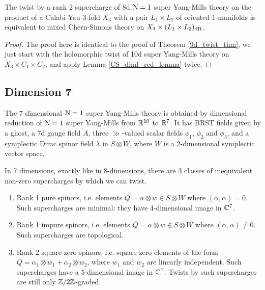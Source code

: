 \documentclass[10pt, oneside]{article}
\begin{document}
\begin{theorem} \label{8d_rank2_twist_thm}
The twist by a rank 2 supercharge of 8d $\mathcal{N}=1$ super Yang-Mills theory on the product of a Calabi-Yau 3-fold $X_3$ with a pair $L_1 \times L_2$ of oriented 1-manifolds is equivalent to mixed Chern-Simons theory on $X_3 \times (L_1 \times L_2)_{\mathrm{dR}}$.
\end{theorem}

\begin{proof}
The proof here is identical to the proof of Theorem \ref{9d_twist_thm}, we just start with the holomorphic twist of 10d super Yang-Mills theory on $X_3 \times C_1 \times C_2$, and apply Lemma \ref{CS_diml_red_lemma} twice.
\end{proof}



\subsection{Dimension 7}
The 7-dimensional $\mathcal{N}=1$ super Yang-Mills theory is obtained by dimensional reduction of $\mathcal{N}=1$ super Yang-Mills from $\mathbb R^{10}$ to $\mathbb R^7$.  It has BRST fields given by a ghost, a 7d gauge field $A$, three $\gg$-valued scalar fields $\phi_1$, $\phi_2$ and $\phi_3$, and a symplectic Dirac spinor field $\lambda$ in $S \otimes W$, where $W$ is a 2-dimensional symplectic vector space.

In 7 dimensions, exactly like in 8-dimensions, there are 3 classes of inequivalent non-zero supercharges by which we can twist.
\begin{enumerate}
 \item Rank 1 pure spinors, i.e. elements $Q = \alpha \otimes w \in S \otimes W$ where $(\alpha, \alpha)=0$.  Such supercharges are minimal: they have 4-dimensional image in $\mathbb C^7$.
 \item Rank 1 impure spinors, i.e. elements $Q = \alpha \otimes w \in S \otimes W$ where $(\alpha, \alpha)\ne 0$.  Such supercharges are topological.
 \item Rank 2 square-zero spinors, i.e. square-zero elements of the form $Q = \alpha_1 \otimes w_1 + \alpha_2 \otimes w_2$, where $w_1$ and $w_2$ are linearly independent.  Such supercharges have a 5-dimensional image in $\mathbb C^7$.  Twists by such supercharges are still only $\mathbb Z/2\mathbb Z$-graded. 
\end{enumerate}
\end{document}
